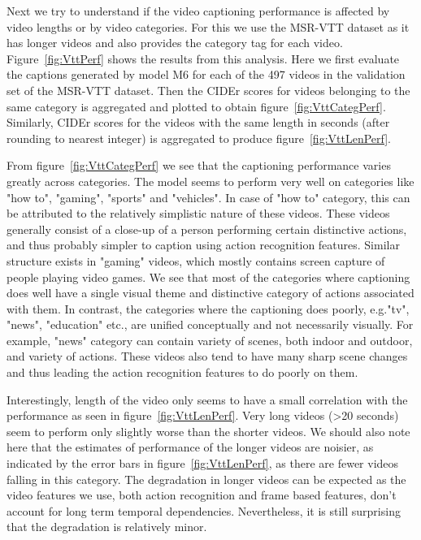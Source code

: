 Next we try to understand if the video captioning performance is affected by
video lengths or by video categories.
For this we use the MSR-VTT dataset as it has longer videos and also provides
the category tag for each video.
Figure~\ref{fig:VttPerf} shows the results from this analysis.
Here we first evaluate the captions generated by model M6 for each of the 497 videos
in the validation set of the MSR-VTT dataset.
Then the CIDEr scores for videos belonging to the same category is aggregated
and plotted to obtain figure~\ref{fig:VttCategPerf}.
Similarly, CIDEr scores for the videos with the same length in seconds (after
rounding to nearest integer) is aggregated to produce
figure~\ref{fig:VttLenPerf}.

From figure~\ref{fig:VttCategPerf} we see that the captioning performance varies
greatly across categories.
The model seems to perform very well on categories like "how to", "gaming",
"sports" and "vehicles".
In case of "how to" category, this can be attributed to the relatively
simplistic nature of these videos.
These videos generally consist of a close-up of a person performing certain
distinctive actions, and thus probably simpler to caption using action
recognition features. 
Similar structure exists in "gaming" videos, which mostly contains screen
capture of people playing video games.
We see that most of the categories where captioning does well have a single
visual theme and distinctive category of actions associated with them. 
In contrast, the categories where the captioning does poorly, e.g.\@ "tv",
"news", "education" etc., are unified conceptually and not necessarily visually.
For example, "news" category can contain variety of scenes, both indoor and
outdoor, and variety of actions. 
These videos also tend to have many sharp scene changes and thus leading the
action recognition features to do poorly on them.

Interestingly, length of the video only seems to have a small correlation with
the performance as seen in figure~\ref{fig:VttLenPerf}.
Very long videos (>20 seconds) seem to perform only slightly worse than the
shorter videos.
We should also note here that the estimates of performance of the longer videos
are noisier, as indicated by the error bars in figure~\ref{fig:VttLenPerf}, as
there are fewer videos falling in this category. 
The degradation in longer videos can be expected as the video features we use,
both action recognition and frame based features, don't account for long term
temporal dependencies.
Nevertheless, it is still surprising that the degradation is relatively minor.

